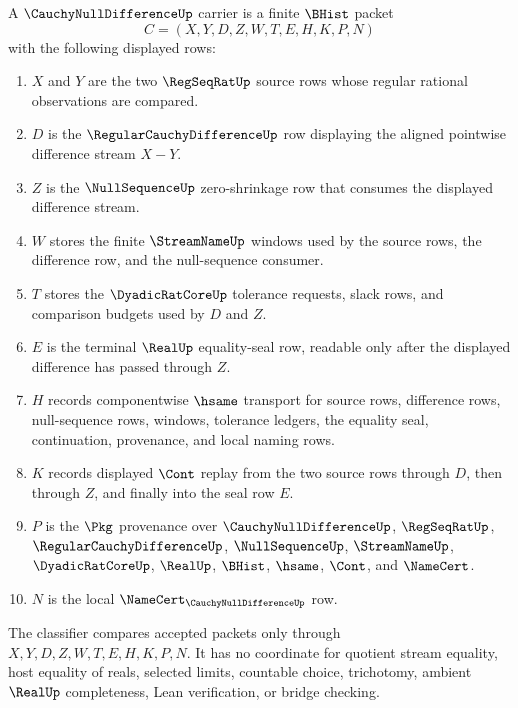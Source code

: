 \begin{definition}
\label{def:cauchy-null-difference-carrier}
A $\CauchyNullDifferenceUp$ carrier is a finite $\BHist$ packet
$$
C=(X,Y,D,Z,W,T,E,H,K,P,N)
$$
with the following displayed rows:
\begin{enumerate}
\item $X$ and $Y$ are the two $\RegSeqRatUp$ source rows whose regular rational observations are compared.
\item $D$ is the $\RegularCauchyDifferenceUp$ row displaying the aligned pointwise difference stream $X-Y$.
\item $Z$ is the $\NullSequenceUp$ zero-shrinkage row that consumes the displayed difference stream.
\item $W$ stores the finite $\StreamNameUp$ windows used by the source rows, the difference row, and the null-sequence consumer.
\item $T$ stores the $\DyadicRatCoreUp$ tolerance requests, slack rows, and comparison budgets used by $D$ and $Z$.
\item $E$ is the terminal $\RealUp$ equality-seal row, readable only after the displayed difference has passed through $Z$.
\item $H$ records componentwise $\hsame$ transport for source rows, difference rows, null-sequence rows, windows, tolerance ledgers, the equality seal, continuation, provenance, and local naming rows.
\item $K$ records displayed $\Cont$ replay from the two source rows through $D$, then through $Z$, and finally into the seal row $E$.
\item $P$ is the $\Pkg$ provenance over $\CauchyNullDifferenceUp$, $\RegSeqRatUp$, $\RegularCauchyDifferenceUp$, $\NullSequenceUp$, $\StreamNameUp$, $\DyadicRatCoreUp$, $\RealUp$, $\BHist$, $\hsame$, $\Cont$, and $\NameCert$.
\item $N$ is the local $\NameCert_{\CauchyNullDifferenceUp}$ row.
\end{enumerate}
The classifier compares accepted packets only through $X,Y,D,Z,W,T,E,H,K,P,N$. It has no coordinate for quotient stream equality, host equality of reals, selected limits, countable choice, trichotomy, ambient $\RealUp$ completeness, Lean verification, or bridge checking.
\end{definition}

